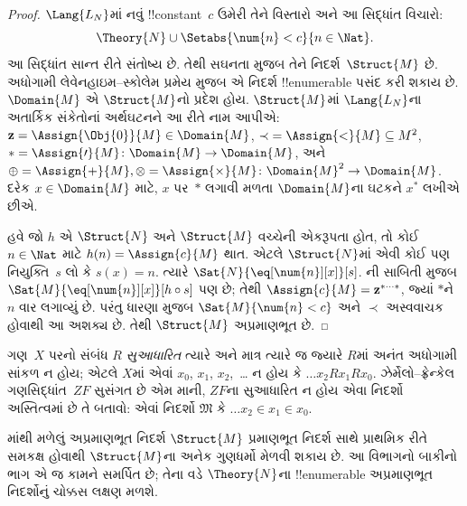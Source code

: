 \documentclass[../../../include/open-logic-section]{subfiles}
\begin{document}
\begin{proof}
$\Lang{L_N}$માં નવું !!{constant}~$c$
ઉમેરી તેને વિસ્તારો અને આ સિદ્ધાંત વિચારો:
\[
\Theory{N} \cup \Setabs{\num{n} < c}{n \in \Nat}.
\]
આ સિદ્ધાંત સાન્ત રીતે સંતોષ્ય છે.
તેથી સઘનતા મુજબ તેને નિદર્શ~$\Struct{M}$
છે. અધોગામી લેવેનહાઇમ--સ્કોલેમ પ્રમેય
મુજબ એ નિદર્શ !!{enumerable} પસંદ
કરી શકાય છે. $\Domain{M}$ એ
$\Struct{M}$નો પ્રદેશ હોય.
$\Struct{M}$માં $\Lang{L_N}$ના
અતાર્કિક સંકેતોનાં અર્થઘટનને આ રીતે
નામ આપીએ: $\mathbf{z} = \Assign{\Obj{0}}{M} \in \Domain{M}$,
${\prec} = \Assign{<}{M} \subseteq M^2$,
$* = \Assign{\prime}{M} \colon
\Domain{M} \to \Domain{M}$, અને
$\oplus = \Assign{+}{M}, \otimes =
\Assign{\times}{M} \colon \Domain{M}^2 \to \Domain{M}$.
દરેક $x \in \Domain{M}$ માટે,
$x$ પર~$*$ લગાવી મળતા
$\Domain{M}$ના ઘટકને $x^*$
લખીએ છીએ.

હવે જો $h$ એ $\Struct{N}$ અને
$\Struct{M}$ વચ્ચેની એકરૂપતા હોત,
તો કોઈ $n \in \Nat$ માટે
$h(n) = \Assign{c}{M}$ થાત.
એટલે $\Struct{N}$માં એવી
કોઈ પણ નિયુક્તિ~$s$ લો કે
$s(x) = n$. ત્યારે
$\Sat{N}{\eq[\num{n}][x]}[s]$.
ની સાબિતી
મુજબ $\Sat{M}{\eq[\num{n}][x]}[h \circ s]$
પણ છે; તેથી $\Assign{c}{M} =
\mathbf{z}^{*\cdots *}$, જ્યાં
$*$ને $n$ વાર લગાવ્યું છે.
પરંતુ ધારણા મુજબ
$\Sat{M}{\num{n} < c}$ અને
$\prec$ અસ્વવાચક હોવાથી
આ અશક્ય છે. તેથી
$\Struct{M}$ અપ્રમાણભૂત છે.
\end{proof}

\begin{prob}
ગણ~$X$ પરનો સંબંધ $R$
\emph{સુઆધારિત} ત્યારે અને માત્ર ત્યારે
જ જ્યારે $R$માં અનંત અધોગામી
સાંકળ ન હોય; એટલે $X$માં
એવાં $x_0$, $x_1$, $x_2$,~\dots
ન હોય કે $\dots x_2Rx_1Rx_0$.
ઝેર્મેલો--ફ્રેન્કેલ ગણસિદ્ધાંત~$ZF$
સુસંગત છે એમ માની, $ZF$ના
સુઆધારિત ન હોય એવા નિદર્શો
અસ્તિત્વમાં છે તે બતાવો:
એવાં નિદર્શો $\mathfrak{M}$
કે $\dots x_2 \in x_1 \in x_0$.
\end{prob}

માંથી મળેલું
અપ્રમાણભૂત નિદર્શ $\Struct{M}$
પ્રમાણભૂત નિદર્શ સાથે
પ્રાથમિક રીતે સમકક્ષ હોવાથી
$\Struct{M}$ના અનેક ગુણધર્મો
મેળવી શકાય છે. આ વિભાગનો
બાકીનો ભાગ એ જ કામને સમર્પિત
છે; તેના વડે $\Theory{N}$ના
!!{enumerable} અપ્રમાણભૂત
નિદર્શોનું ચોક્કસ લક્ષણ
મળશે.
\end{document}
